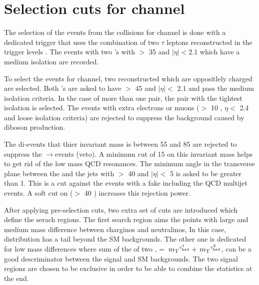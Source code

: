 \section{\texorpdfstring{Selection cuts for \Tau\Tau channel}{Selection cuts for tau-tau channel}}
\label{sect:tauTauCuts}
The selection of the events from the collisions for \Tau\Tau channel
is done with a dedicated trigger that uses the combination of 
two $\tau$ leptons reconstructed in the trigger levels \cite{CMS:2013hoa,Chatrchyan:2012xi,Chatrchyan:2011nv}.
The events with two \Tau's with \PT $>$ 35 \GeV and $|\eta|<$2.1 which have a medium isolation are recorded. 

To select the events for \Tau\Tau channel, two reconstructed \Tau which are oppositlely charged are selected. Both \Tau's are asked to 
have \PT $>$ 45 \GeV and $|\eta| <$ 2.1 and pass the medium isolation criteria.
In the case of more than one pair, the pair with the tightest isolation 
is selected.
The events with extra electrons or muons (\PT $>$ 10 \GeV, $\eta <$ 2.4 and loose isolation criteria) 
are rejected to suppress %
the background caused by diboson production.

The di-\Tau events that thier invariant mass is between 55 and 85 \GeV are rejected to suppress the \Z$\rightarrow$\Tau\Tau events (\Z veto).
A minimum cut of 15 \GeV on this invariant mass helps to get rid of the low mass
QCD resonances. The minimum angle in the transverse plane between the \MET and the jets with \PT $>$ 40 \GeV and $|\eta| <$ 5 
is asked to be greater than 1. This is a cut against the events with a fake \MET including the QCD multijet events. A soft cut on 
\mttwo ($>$ 40 \GeV) increases this rejection power.

After applying pre-selection cuts, two extra set of cuts are introduced which define the serach regions.
The first search region aims the points with large and medium mass difference between charginos and neutralinos, In this case,  \mttwo  distribution has a tail beyond the 
SM backgrounds. 
The other one is dedicated for low mass differences where sum of the \mt of two \Tau, \SumMT = $\,{m_{\rm T}}^{\tau_{\rm had}^1} + \,{m_{\rm T}}^{\tau_{\rm had}^2}$, can be a good descriminator between the signal and SM backgrounds.
The two signal regions are chosen to be exclusive in order 
to be able to combine the statistics at the end. 

